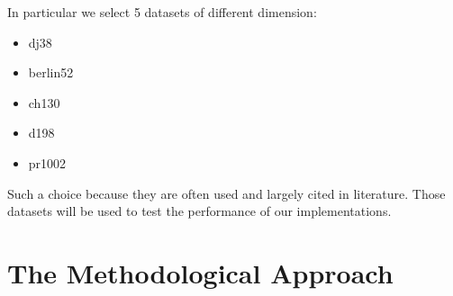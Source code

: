 \documentclass[10pt]{article}
\begin{document}
In particular we select 5 datasets of different dimension:
\begin{itemize}[noitemsep]
\item dj38
\item berlin52
\item ch130
\item d198
\item pr1002
\end{itemize}
Such a choice because they are often used and largely cited in literature. %
Those datasets will be used to test the performance of our implementations.
\vfill
\newpage
\section{The Methodological Approach}
\end{document}
